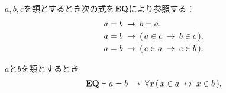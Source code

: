 	\begin{screen}
		\begin{axm}[相等性公理]
			$a,b,c$を類とするとき次の式を$\mbox{{\bf EQ}}$により参照する：
			\begin{align}
				a = b &\hspace{0.25em}\rightarrow\hspace{0.25em} b = a,  \\
				a = b &\hspace{0.25em}\rightarrow\hspace{0.25em} (\, a \in c \hspace{0.25em}\rightarrow\hspace{0.25em} b \in c\, ), \\
				a = b &\hspace{0.25em}\rightarrow\hspace{0.25em} (\, c \in a \hspace{0.25em}\rightarrow\hspace{0.25em} c \in b\, ). 
			\end{align}
		\end{axm}
	\end{screen}
	
	\begin{screen}
		\begin{thm}[外延性の公理の逆も成り立つ]
		\label{thm:inverse_of_axiom_of_extensionality}
			$a$と$b$を類とするとき
			\begin{align}
				\mbox{{\bf EQ}} \vdash 
				a = b \hspace{0.25em}\rightarrow\hspace{0.25em} \forall x\, (\, x \in a  \hspace{0.25em}\leftrightarrow\hspace{0.25em} x \in b\, ).
			\end{align}
		\end{thm}
	\end{screen}
	
